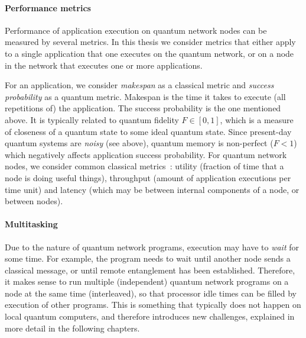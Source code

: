 \paragraph{Performance metrics}
Performance of application execution on quantum network nodes can be measured by several metrics.
In this thesis we consider metrics that either apply to a single application that one executes on the quantum network, or on a node in the network that executes one or more applications.

For an application, we consider \textit{makespan} as a classical metric and \textit{success probability} as a quantum metric.
Makespan is the time it takes to execute (all repetitions of) the application.
The success probability is the one mentioned above.
It is typically related to quantum fidelity $F \in [0, 1]$, which is a measure of closeness of a quantum state to some ideal quantum state.
Since present-day quantum systems are \emph{noisy} (see above), quantum memory is non-perfect ($F < 1$) which negatively affects application success probability.
For quantum network nodes, we consider common classical metrics~\cite{stankiewicz_commag}: utility (fraction of time that a node is doing useful things), throughput (amount of application executions per time unit) and latency (which may be between internal components of a node, or between nodes).


\paragraph{Multitasking}
Due to the nature of quantum network programs, execution may have to \textit{wait} for some time. For example, the program needs to wait until another node sends a classical message, or until remote entanglement has been established.
Therefore, it makes sense to run multiple (independent) quantum network programs on a node at the same time (interleaved), so that processor idle times can be filled by execution of other programs. This is something that typically does not happen on local quantum computers, and therefore introduces new challenges, explained in more detail in the following chapters.


\begin{xstretch}
\printbibliography[heading=subbibintoc,title={References},notcategory=noprint]
\end{xstretch}
